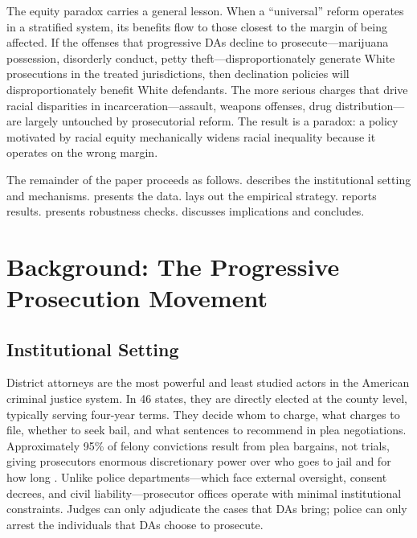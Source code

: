 \documentclass[12pt]{article}
\begin{document}
The equity paradox carries a general lesson. When a ``universal'' reform operates in a stratified system, its benefits flow to those closest to the margin of being affected. If the offenses that progressive DAs decline to prosecute---marijuana possession, disorderly conduct, petty theft---disproportionately generate White prosecutions in the treated jurisdictions, then declination policies will disproportionately benefit White defendants. The more serious charges that drive racial disparities in incarceration---assault, weapons offenses, drug distribution---are largely untouched by prosecutorial reform. The result is a paradox: a policy motivated by racial equity mechanically widens racial inequality because it operates on the wrong margin.

The remainder of the paper proceeds as follows.  describes the institutional setting and mechanisms.  presents the data.  lays out the empirical strategy.  reports results.  presents robustness checks.  discusses implications and concludes.


\section{Background: The Progressive Prosecution Movement}
\label{sec:background}

\subsection{Institutional Setting}

District attorneys are the most powerful and least studied actors in the American criminal justice system. In 46 states, they are directly elected at the county level, typically serving four-year terms. They decide whom to charge, what charges to file, whether to seek bail, and what sentences to recommend in plea negotiations. Approximately 95\% of felony convictions result from plea bargains, not trials, giving prosecutors enormous discretionary power over who goes to jail and for how long \citep{pfaff2017locked}. Unlike police departments---which face external oversight, consent decrees, and civil liability---prosecutor offices operate with minimal institutional constraints. Judges can only adjudicate the cases that DAs bring; police can only arrest the individuals that DAs choose to prosecute.
\end{document}
